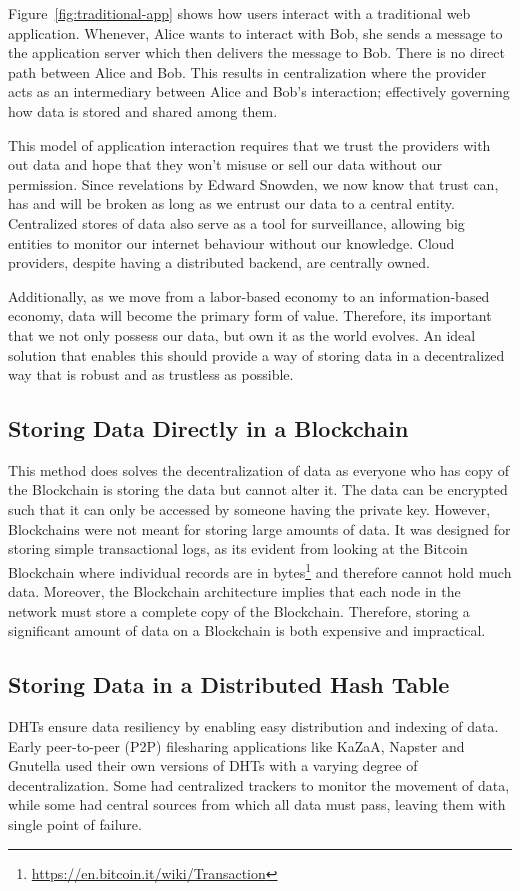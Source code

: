 	Figure~\ref{fig:traditional-app} shows how users interact with a traditional web application. Whenever, Alice wants to interact with Bob, she sends a message to the application server which then delivers the message to Bob. There is no direct path between Alice and Bob. This results in centralization where the provider acts as an intermediary between Alice and Bob's interaction; effectively governing how data is stored and shared among them.
		
	This model of application interaction requires that we trust the providers with out data and hope that they won't misuse or sell our data without our permission. Since revelations by Edward Snowden\cite{greenwald2014no}, we now know that trust can, has and will be broken as long as we entrust our data to a central entity\cite{raval2016decentralized}. Centralized stores of data also serve as a tool for surveillance, allowing big entities to monitor our internet behaviour without our knowledge. Cloud providers, despite having a distributed backend, are centrally owned.
		
	Additionally, as we move from a labor-based economy to an information-based economy, data will become the primary form of value. Therefore, its important that we not only possess our data, but own it as the world evolves. An ideal solution that enables this should provide a way of storing data in a decentralized way that is robust and as trustless as possible\cite{raval2016decentralized}.
	
	\subsection{Storing Data Directly in a Blockchain}
		This method does solves the decentralization of data as everyone who has copy of the Blockchain is storing the data but cannot alter it. The data can be encrypted such that it can only be accessed by someone having the private key. However, Blockchains were not meant for storing large amounts of data. It was designed for storing simple transactional logs, as its evident from looking at the Bitcoin Blockchain where individual records are in bytes\footnote{\url{https://en.bitcoin.it/wiki/Transaction}} and therefore cannot hold much data. Moreover, the Blockchain architecture implies that each node in the network must store a complete copy of the Blockchain. Therefore, storing a significant amount of data on a Blockchain is both expensive and impractical.
		
	\subsection{Storing Data in a Distributed Hash Table}
		DHTs ensure data resiliency by enabling easy distribution and indexing of data. Early peer-to-peer (P2P) filesharing applications like KaZaA\cite{good2003usability}, Napster\cite{ku2002creative} and Gnutella\cite{ripeanu2002mapping} used their own versions of DHTs with a varying degree of decentralization. Some had centralized trackers to monitor the movement of data, while some had central sources from which all data must pass, leaving them with single point of failure\cite{raval2016decentralized}.
		
